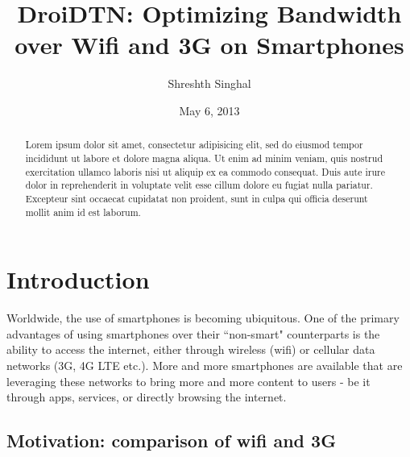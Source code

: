 \documentclass[12pt, fleqn]{article}
\title{DroiDTN: Optimizing Bandwidth over Wifi and 3G on Smartphones}
\author{Shreshth Singhal}
\date{May 6, 2013}
\begin{document}
\maketitle

\begin{abstract}
  Lorem ipsum dolor sit amet, consectetur adipisicing elit, sed do eiusmod 
  tempor incididunt ut labore et dolore magna aliqua. Ut enim ad minim veniam, 
quis nostrud exercitation ullamco laboris nisi ut aliquip ex ea commodo consequat. 
Duis aute irure dolor in reprehenderit in voluptate velit esse cillum dolore eu fugiat 
nulla pariatur. Excepteur sint occaecat cupidatat non proident, sunt in culpa qui officia 
deserunt mollit anim id est laborum.
\end{abstract}


\section{Introduction}

Worldwide, the use of smartphones is becoming ubiquitous. One of the primary 
advantages of using smartphones over their ``non-smart" counterparts 
is the ability to access the internet, either through wireless (wifi) or 
cellular data networks (3G, 4G LTE etc.). More and more smartphones are available that are leveraging 
these networks to bring more and more content to users - be it through apps, 
services, or directly browsing the internet.


\subsection{Motivation: comparison of wifi and 3G}
\end{document}
